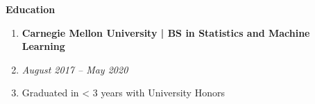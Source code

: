 \documentclass[letterpaper,11pt]{article}
\begin{document}
\begin{mybox}
	\hspace{-8pt} \textbf{\LARGE Education}
\end{mybox}

\begin{enumerate}[leftmargin=10pt]

	\item[] \textbf{\Large Carnegie Mellon University | \textcolor{myBlue}{BS in Statistics and Machine Learning}} \\
	\item[] \large \textit{\textcolor{myBlue}{August 2017 --} May 2020} \\
	\item[] \large Graduated in < 3 years with University Honors
\end{enumerate}
\end{document}
